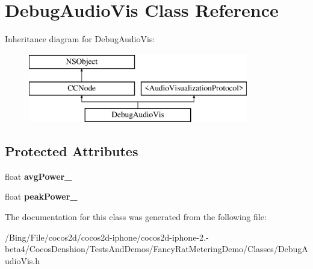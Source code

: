 \hypertarget{interface_debug_audio_vis}{\section{Debug\-Audio\-Vis Class Reference}
\label{interface_debug_audio_vis}
}
Inheritance diagram for Debug\-Audio\-Vis\-:\begin{figure}[H]
\begin{center}
\leavevmode
\includegraphics[height=3.000000cm]{interface_debug_audio_vis}
\end{center}
\end{figure}
\subsection*{Protected Attributes}
\begin{DoxyCompactItemize}
\item 
\hypertarget{interface_debug_audio_vis_a5c517740dff58bad0b63f68157060248}{float {\bfseries avg\-Power\-\_\-}}\label{interface_debug_audio_vis_a5c517740dff58bad0b63f68157060248}

\item 
\hypertarget{interface_debug_audio_vis_a7e447298b5db4209da3c36bd5a2ed71a}{float {\bfseries peak\-Power\-\_\-}}\label{interface_debug_audio_vis_a7e447298b5db4209da3c36bd5a2ed71a}

\end{DoxyCompactItemize}


The documentation for this class was generated from the following file\-:\begin{DoxyCompactItemize}
\item 
/\-Bing/\-File/cocos2d/cocos2d-\/iphone/cocos2d-\/iphone-\/2.-\/beta4/\-Cocos\-Denshion/\-Tests\-And\-Demos/\-Fancy\-Rat\-Metering\-Demo/\-Classes/Debug\-Audio\-Vis.\-h\end{DoxyCompactItemize}
